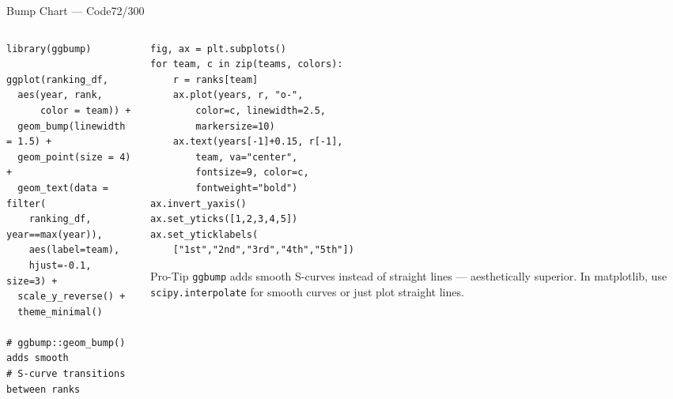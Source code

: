 \documentclass[10pt]{beamer}
\newcommand{\smark}[1]{\hfill{\scriptsize\color{codegray}#1}}
\begin{document}
\begin{frame}[fragile]{Bump Chart --- Code}\smark{72/300}
\begin{columns}[T]
\begin{column}{0.48\textwidth}
\begin{lstlisting}[style=Rstyle]
library(ggbump)

ggplot(ranking_df,
  aes(year, rank,
      color = team)) +
  geom_bump(linewidth = 1.5) +
  geom_point(size = 4) +
  geom_text(data = filter(
    ranking_df, year==max(year)),
    aes(label=team),
    hjust=-0.1, size=3) +
  scale_y_reverse() +
  theme_minimal()

# ggbump::geom_bump() adds smooth
# S-curve transitions between ranks
\end{lstlisting}
\end{column}
\begin{column}{0.48\textwidth}
\begin{lstlisting}[style=Pystyle]
fig, ax = plt.subplots()
for team, c in zip(teams, colors):
    r = ranks[team]
    ax.plot(years, r, "o-",
        color=c, linewidth=2.5,
        markersize=10)
    ax.text(years[-1]+0.15, r[-1],
        team, va="center",
        fontsize=9, color=c,
        fontweight="bold")
ax.invert_yaxis()
ax.set_yticks([1,2,3,4,5])
ax.set_yticklabels(
    ["1st","2nd","3rd","4th","5th"])
\end{lstlisting}
\vspace{0.1cm}
\begin{alertblock}{Pro-Tip}
    \scriptsize \texttt{ggbump} adds smooth S-curves instead of straight lines --- aesthetically superior. In matplotlib, use \texttt{scipy.interpolate} for smooth curves or just plot straight lines.
\end{alertblock}
\end{column}
\end{columns}
\end{frame}
\end{document}
